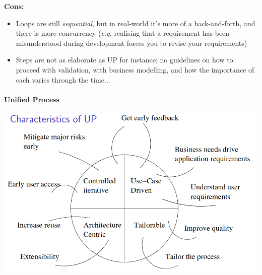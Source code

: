 \documentclass[a4paper]{article}
\providecommand{\tightlist}{%
  \setlength{\itemsep}{0pt}\setlength{\parskip}{0pt}}
\let\oldparagraph\paragraph
\renewcommand{\paragraph}[1]{\oldparagraph{#1}\mbox{}}
\begin{document}
\textbf{Cons:}

\begin{itemize}
\tightlist
\item
  Loops are still \emph{sequential}, but in real-world it's more of a
  back-and-forth, and there is more concurrency (\emph{e.g.} realising
  that a requirement has been misunderstood during development forces
  you to revise your requirements)
\item
  Steps are not as elaborate as UP for instance; no guidelines on how to
  proceed with validation, with business modelling, and how the
  importance of each varies through the time...
\end{itemize}

\hypertarget{unified-process}{%
\paragraph{Unified Process}\label{unified-process}}

\includegraphics{2C-SE.assets/1543143798585.png}
\end{document}
